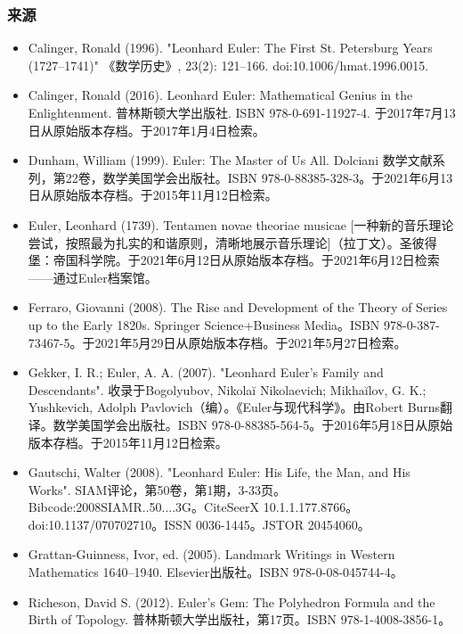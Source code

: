 \subsubsection{来源}
\begin{itemize}
\item Calinger, Ronald (1996). "Leonhard Euler: The First St. Petersburg Years (1727–1741)"  
《数学历史》, 23(2): 121–166. doi:10.1006/hmat.1996.0015.  
\item Calinger, Ronald (2016). Leonhard Euler: Mathematical Genius in the Enlightenment. 
普林斯顿大学出版社. ISBN 978-0-691-11927-4. 于2017年7月13日从原始版本存档。于2017年1月4日检索。
\item Dunham, William (1999). Euler: The Master of Us All. 
Dolciani 数学文献系列，第22卷，数学美国学会出版社。ISBN 978-0-88385-328-3。于2021年6月13日从原始版本存档。于2015年11月12日检索。
\item Euler, Leonhard (1739). Tentamen novae theoriae musicae  
[一种新的音乐理论尝试，按照最为扎实的和谐原则，清晰地展示音乐理论]（拉丁文）。圣彼得堡：帝国科学院。于2021年6月12日从原始版本存档。于2021年6月12日检索——通过Euler档案馆。
\item Ferraro, Giovanni (2008). The Rise and Development of the Theory of Series up to the Early 1820s. 
Springer Science+Business Media。ISBN 978-0-387-73467-5。于2021年5月29日从原始版本存档。于2021年5月27日检索。
\item Gekker, I. R.; Euler, A. A. (2007). "Leonhard Euler's Family and Descendants".  
收录于Bogolyubov, Nikolaĭ Nikolaevich; Mikhaĭlov, G. K.; Yushkevich, Adolph Pavlovich（编）。《Euler与现代科学》。由Robert Burns翻译。数学美国学会出版社。ISBN 978-0-88385-564-5。于2016年5月18日从原始版本存档。于2015年11月12日检索。
\item Gautschi, Walter (2008). "Leonhard Euler: His Life, the Man, and His Works". 
SIAM评论，第50卷，第1期，3-33页。Bibcode:2008SIAMR..50....3G。CiteSeerX 10.1.1.177.8766。doi:10.1137/070702710。ISSN 0036-1445。JSTOR 20454060。
\item Grattan-Guinness, Ivor, ed. (2005). Landmark Writings in Western Mathematics 1640–1940.  
Elsevier出版社。ISBN 978-0-08-045744-4。
\item Richeson, David S. (2012). Euler's Gem: The Polyhedron Formula and the Birth of Topology.  
普林斯顿大学出版社，第17页。ISBN 978-1-4008-3856-1。
\end{itemize}
